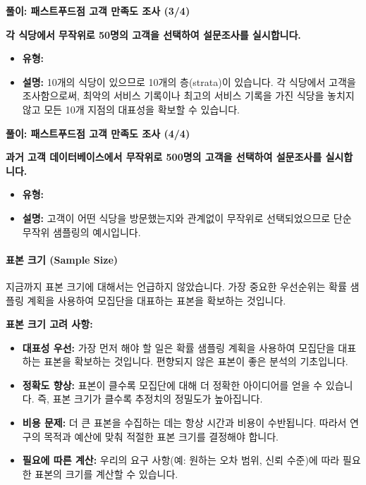 \documentclass[11pt,a4paper]{article}
\begin{document}
\begin{solutionbox}
\textbf{풀이: 패스트푸드점 고객 만족도 조사 (3/4)}
\begin{enumerate}
    \setcounter{enumi}{2}
    \textbf{각 식당에서 무작위로 50명의 고객을 선택하여 설문조사를 실시합니다.}
    \begin{itemize}
        \item \textbf{유형:} 
        \item \textbf{설명:} 10개의 식당이 있으므로 10개의 층(strata)이 있습니다. 각 식당에서 고객을 조사함으로써, 최악의 서비스 기록이나 최고의 서비스 기록을 가진 식당을 놓치지 않고 모든 10개 지점의 대표성을 확보할 수 있습니다.
    \end{itemize}
\end{enumerate}
\end{solutionbox}

\begin{solutionbox}
\textbf{풀이: 패스트푸드점 고객 만족도 조사 (4/4)}
\begin{enumerate}
    \setcounter{enumi}{3}
    \textbf{과거 고객 데이터베이스에서 무작위로 500명의 고객을 선택하여 설문조사를 실시합니다.}
    \begin{itemize}
        \item \textbf{유형:} 
        \item \textbf{설명:} 고객이 어떤 식당을 방문했는지와 관계없이 무작위로 선택되었으므로 단순 무작위 샘플링의 예시입니다.
    \end{itemize}
\end{enumerate}
\end{solutionbox}

\paragraph{표본 크기 (Sample Size)}
지금까지 표본 크기에 대해서는 언급하지 않았습니다. 가장 중요한 우선순위는 확률 샘플링 계획을 사용하여 모집단을 대표하는 표본을 확보하는 것입니다.

\begin{tcolorbox}[summarybox]
\textbf{표본 크기 고려 사항:}
\begin{itemize}
    \item \textbf{대표성 우선:} 가장 먼저 해야 할 일은 확률 샘플링 계획을 사용하여 모집단을 대표하는 표본을 확보하는 것입니다. 편향되지 않은 표본이 좋은 분석의 기초입니다.
    \item \textbf{정확도 향상:} 표본이 클수록 모집단에 대해 더 정확한 아이디어를 얻을 수 있습니다. 즉, 표본 크기가 클수록 추정치의 정밀도가 높아집니다.
    \item \textbf{비용 문제:} 더 큰 표본을 수집하는 데는 항상 시간과 비용이 수반됩니다. 따라서 연구의 목적과 예산에 맞춰 적절한 표본 크기를 결정해야 합니다.
    \item \textbf{필요에 따른 계산:} 우리의 요구 사항(예: 원하는 오차 범위, 신뢰 수준)에 따라 필요한 표본의 크기를 계산할 수 있습니다.
\end{itemize}
\end{tcolorbox}
\end{document}
